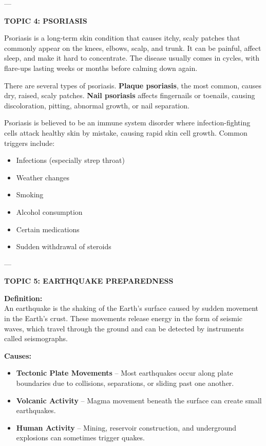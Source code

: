 {{---

\textbf{TOPIC 4: PSORIASIS}

Psoriasis is a long-term skin condition that causes itchy, scaly patches that commonly appear on the knees, elbows, scalp, and trunk. It can be painful, affect sleep, and make it hard to concentrate. The disease usually comes in cycles, with flare-ups lasting weeks or months before calming down again.

There are several types of psoriasis. \textbf{Plaque psoriasis}, the most common, causes dry, raised, scaly patches. \textbf{Nail psoriasis} affects fingernails or toenails, causing discoloration, pitting, abnormal growth, or nail separation.

Psoriasis is believed to be an immune system disorder where infection-fighting cells attack healthy skin by mistake, causing rapid skin cell growth. Common triggers include:
\begin{itemize}
    \item Infections (especially strep throat)
    \item Weather changes
    \item Smoking
    \item Alcohol consumption
    \item Certain medications
    \item Sudden withdrawal of steroids
\end{itemize}

---

\textbf{TOPIC 5: EARTHQUAKE PREPAREDNESS}

\textbf{Definition:}\\
An earthquake is the shaking of the Earth's surface caused by sudden movement in the Earth's crust. These movements release energy in the form of seismic waves, which travel through the ground and can be detected by instruments called seismographs.

\textbf{Causes:}
\begin{itemize}
    \item \textbf{Tectonic Plate Movements} – Most earthquakes occur along plate boundaries due to collisions, separations, or sliding past one another.
    \item \textbf{Volcanic Activity} – Magma movement beneath the surface can create small earthquakes.
    \item \textbf{Human Activity} – Mining, reservoir construction, and underground explosions can sometimes trigger quakes.
\end{itemize}

}}
